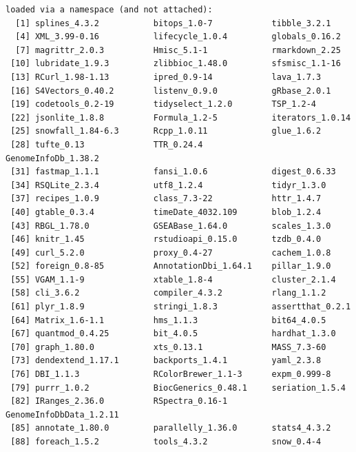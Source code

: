 \documentclass{amsart}
\begin{document}
\begin{verbatim}
loaded via a namespace (and not attached):
  [1] splines_4.3.2           bitops_1.0-7            tibble_3.2.1                              
  [4] XML_3.99-0.16           lifecycle_1.0.4         globals_0.16.2                            
  [7] magrittr_2.0.3          Hmisc_5.1-1             rmarkdown_2.25                        
 [10] lubridate_1.9.3         zlibbioc_1.48.0         sfsmisc_1.1-16                                 
 [13] RCurl_1.98-1.13         ipred_0.9-14            lava_1.7.3                               
 [16] S4Vectors_0.40.2        listenv_0.9.0           gRbase_2.0.1                                
 [19] codetools_0.2-19        tidyselect_1.2.0        TSP_1.2-4                                             
 [22] jsonlite_1.8.8          Formula_1.2-5           iterators_1.0.14                     
 [25] snowfall_1.84-6.3       Rcpp_1.0.11             glue_1.6.2                           
 [28] tufte_0.13              TTR_0.24.4              GenomeInfoDb_1.38.2         
 [31] fastmap_1.1.1           fansi_1.0.6             digest_0.6.33                  
 [34] RSQLite_2.3.4           utf8_1.2.4              tidyr_1.3.0                  
 [37] recipes_1.0.9           class_7.3-22            httr_1.4.7                      
 [40] gtable_0.3.4            timeDate_4032.109       blob_1.2.4                     
 [43] RBGL_1.78.0             GSEABase_1.64.0         scales_1.3.0                        
 [46] knitr_1.45              rstudioapi_0.15.0       tzdb_0.4.0                         
 [49] curl_5.2.0              proxy_0.4-27            cachem_1.0.8                     
 [52] foreign_0.8-85          AnnotationDbi_1.64.1    pillar_1.9.0                        
 [55] VGAM_1.1-9              xtable_1.8-4            cluster_2.1.4                       
 [58] cli_3.6.2               compiler_4.3.2          rlang_1.1.2                     
 [61] plyr_1.8.9              stringi_1.8.3           assertthat_0.2.1               
 [64] Matrix_1.6-1.1          hms_1.1.3               bit64_4.0.5                      
 [67] quantmod_0.4.25         bit_4.0.5               hardhat_1.3.0 
 [70] graph_1.80.0            xts_0.13.1              MASS_7.3-60 
 [73] dendextend_1.17.1       backports_1.4.1         yaml_2.3.8   
 [76] DBI_1.1.3               RColorBrewer_1.1-3      expm_0.999-8   
 [79] purrr_1.0.2             BiocGenerics_0.48.1     seriation_1.5.4 
 [82] IRanges_2.36.0          RSpectra_0.16-1         GenomeInfoDbData_1.2.11
 [85] annotate_1.80.0         parallelly_1.36.0       stats4_4.3.2 
 [88] foreach_1.5.2           tools_4.3.2             snow_0.4-4

\end{verbatim}
\end{document}
